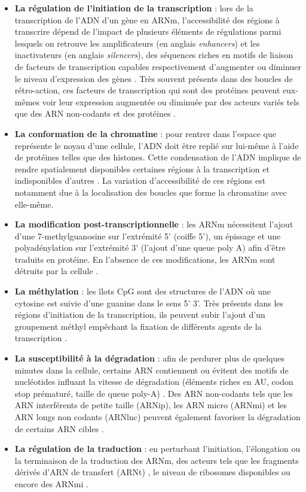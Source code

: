 \begin{itemize}
    \item \textbf{La régulation de l'initiation de la transcription} : lors de la transcription de l'ADN d'un gène en ARNm, l'accessibilité des régions à transcrire dépend de l'impact de plusieurs éléments de régulations parmi lesquels on retrouve les amplificateurs (en anglais \textit{enhancers}) et les inactivateurs (en anglais \textit{silencers}), des séquences riches en motifs de liaison de facteurs de transcription capables respectivement d'augmenter ou diminuer le niveau d'expression des gènes \cite{Levo2014Jul}. Très souvent présents dans des boucles de rétro-action, ces facteurs de transcription qui sont des protéines peuvent eux-mêmes voir leur expression augmentée ou diminuée par des acteurs variés tels que des ARN non-codants et des protéines \cite{Chen2020May}.
    \item \textbf{La conformation de la chromatine} : pour rentrer dans l'espace que représente le noyau d'une cellule, l'ADN doit être replié sur lui-même à l'aide de protéines telles que des histones. Cette condensation de l'ADN implique de rendre spatialement disponibles certaines régions à la transcription et indisponibles d'autres \cite{Kadauke2009Jan}.
    La variation d'accessibilité de ces régions est notamment due à la localisation des boucles que forme la chromatine avec elle-même.
    \item \textbf{La modification post-transcriptionnelle} : les ARNm nécessitent l'ajout d'une 7-methylguanosine sur l'extrémité 5' (coiffe 5'), un épissage et une polyadénylation sur l'extrémité 3' (l'ajout d'une queue poly A) afin d'être traduits en protéine. En l'absence de ces modifications, les ARNm sont détruits par la cellule \cite{Mercer2010Nov}.
    \item \textbf{La méthylation} : les îlots CpG sont des structures de l'ADN où une cytosine est suivie d'une guanine dans le sens 5' \textrightarrow{} 3'. Très présents dans les régions d'initiation de la transcription, ils peuvent subir l'ajout d'un groupement méthyl empêchant la fixation de différents agents de la transcription \cite{Gutierrez-Arcelus2013Jun}.
    \item \textbf{La susceptibilité à la dégradation} : afin de perdurer plus de quelques minutes dans la cellule, certains ARN contiennent ou évitent des motifs de nucléotides influant la vitesse de dégradation (éléments riches en AU, codon stop prématuré, taille de queue poly-A) \cite{Yu2001}. Des ARN non-codants tels que les ARN interférents de petite taille (ARNip), les ARN micro (ARNmi) et les ARN longs non codants (ARNlnc) peuvent également favoriser la dégradation de certains ARN cibles \cite{Patil2014Jan}.
    \item \textbf{La régulation de la traduction} : en perturbant l'initiation, l'élongation ou la terminaison de la traduction des ARNm, des acteurs tels que les fragments dérivés d'ARN de transfert (ARNt) \cite{Krishna2021Mar}, le niveau de ribosomes disponibles \cite{Khajuria2018Mar} ou encore des ARNmi \cite{Meijer2013Apr}.
\end{itemize}


